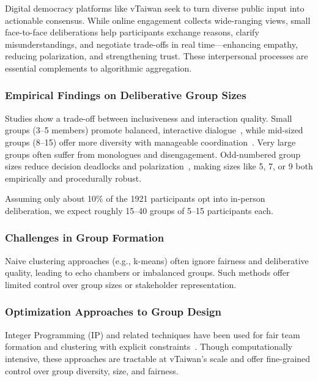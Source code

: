 Digital democracy platforms like vTaiwan seek to turn diverse public input into actionable consensus.
While online engagement collects wide-ranging views, small face-to-face deliberations help participants
exchange reasons, clarify misunderstandings, and negotiate trade-offs in real time—enhancing empathy,
reducing polarization, and strengthening trust.
These interpersonal processes are essential complements to algorithmic aggregation.

\subsubsection*{Empirical Findings on Deliberative Group Sizes}\label{subsec:group_sizes}

Studies show a trade-off between inclusiveness and interaction quality.
Small groups (3–5 members) promote balanced, interactive dialogue~\parencite{fay2000group},
while mid-sized groups (8–15) offer more diversity with manageable
coordination~\parencite{involve_citizensjury, fishkin2009deliberative}.
Very large groups often suffer from monologues and disengagement.
Odd-numbered group sizes reduce decision deadlocks and polarization~\parencite{menon2011oddgroups},
making sizes like 5, 7, or 9 both empirically and procedurally robust.

Assuming only about 10\% of the 1921 participants opt into in-person deliberation,
we expect roughly 15–40 groups of 5–15 participants each.

\subsubsection*{Challenges in Group Formation}

Naive clustering approaches (e.g., k-means) often ignore fairness and deliberative quality,
leading to echo chambers or imbalanced groups.
Such methods offer limited control over group sizes or stakeholder representation.

\subsubsection*{Optimization Approaches to Group Design}

Integer Programming (IP) and related techniques have been used for fair team formation and clustering
with explicit constraints~\parencite{anagnostopoulos2012groupformation, celis2018fair}.
Though computationally intensive, these approaches are tractable at vTaiwan's scale and offer
fine-grained control over group diversity, size, and fairness.
